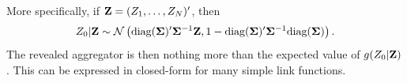 \documentclass[11pt]{article}
\theoremstyle{definition}
\theoremstyle{definition}
\def\bSigma{{\bf \Sigma}}
\def\Z{{\bf Z}}
\def\Var{{\rm Var}\,}
\def\diag{\text{diag}}
\def\diag{\text{diag}}
\begin{document}
%
%
More specifically, if $\Z = (Z_{1}, \dots, Z_{N})'$, then 
\begin{align*}
Z_0 | \Z \sim \mathcal{N}\left(\diag(\bSigma)' \bSigma^{-1} \Z, 1-\diag(\bSigma)' \bSigma^{-1}\diag(\bSigma)\right).
\end{align*}
The revealed aggregator is then nothing more than the expected value of $g(Z_0|\Z)$. This can be expressed in closed-form for many simple link functions. 
\end{document}
